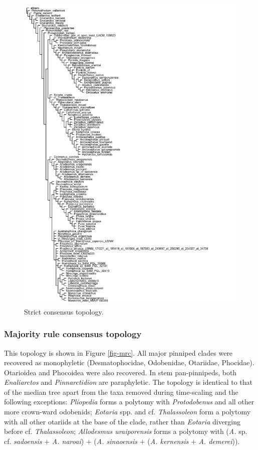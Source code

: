 \documentclass[a4paper, 12pt]{article}
\begin{document}
\begin{figure}[H]
  \centering
  \includegraphics[width = \linewidth]{figures/STR_SCC.pdf}
  \caption{Strict consensus topology.}
  \label{fig-sc}
\end{figure}

\subsubsection{Majority rule consensus topology}

This topology is shown in Figure \ref{fig-mrc}. All major pinniped clades were recovered as monophyletic (Desmatophocidae, Odobenidae, Otariidae, Phocidae). Otarioidea and Phocoidea were also recovered. In stem pan-pinnipeds, both \textit{Enaliarctos} and \textit{Pinnarctidion} are paraphyletic. The topology is identical to that of the median tree apart from the taxa removed during time-scaling and the following exceptions: \textit{Pliopedia} forms a polytomy with \textit{Protodobenus} and all other more crown-ward odobenids; \textit{Eotaria} spp. and cf. \textit{Thalassoleon} form a polytomy with all other otariids at the base of the clade, rather than \textit{Eotaria} diverging before cf. \textit{Thalassoleon}; \textit{Allodesmus uraiporensis} forms a polytomy with (\textit{A.} sp. cf. \textit{sadoensis} $+$ \textit{A. naroai}) $+$ (\textit{A. sinaoensis} $+$ (\textit{A. kernensis} $+$ \textit{A. demerei})).
\end{document}
